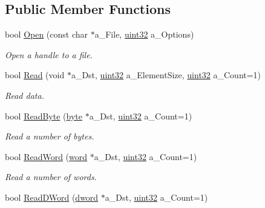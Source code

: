 \subsection*{Public Member Functions}
\begin{DoxyCompactItemize}
\item 
bool \hyperlink{classtil_1_1_file_stream_std_ab58f46883a8ccf5e3884fef0b6cb42d3}{Open} (const char $\ast$a\_\-File, \hyperlink{namespacetil_a20db61688ed403d11f057a508d87e54c}{uint32} a\_\-Options)
\begin{DoxyCompactList}\small\item\em Open a handle to a file. \item\end{DoxyCompactList}\item 
bool \hyperlink{classtil_1_1_file_stream_std_a5a4b5bb51ab27c50f2276c7c904e31b4}{Read} (void $\ast$a\_\-Dst, \hyperlink{namespacetil_a20db61688ed403d11f057a508d87e54c}{uint32} a\_\-ElementSize, \hyperlink{namespacetil_a20db61688ed403d11f057a508d87e54c}{uint32} a\_\-Count=1)
\begin{DoxyCompactList}\small\item\em Read data. \item\end{DoxyCompactList}\item 
bool \hyperlink{classtil_1_1_file_stream_std_a1eea3ea2ef520676df5f5b0c51c2659f}{ReadByte} (\hyperlink{namespacetil_a5f3ec10aca1a788b495a0bd3787bc2dc}{byte} $\ast$a\_\-Dst, \hyperlink{namespacetil_a20db61688ed403d11f057a508d87e54c}{uint32} a\_\-Count=1)
\begin{DoxyCompactList}\small\item\em Read a number of bytes. \item\end{DoxyCompactList}\item 
bool \hyperlink{classtil_1_1_file_stream_std_aadd59b38678d22428f311aa417aeca40}{ReadWord} (\hyperlink{namespacetil_a7903a6761ac6f7472530b2863401909e}{word} $\ast$a\_\-Dst, \hyperlink{namespacetil_a20db61688ed403d11f057a508d87e54c}{uint32} a\_\-Count=1)
\begin{DoxyCompactList}\small\item\em Read a number of words. \item\end{DoxyCompactList}\item 
bool \hyperlink{classtil_1_1_file_stream_std_a638af52afa0f132221dea6cb5b79faa6}{ReadDWord} (\hyperlink{namespacetil_a9babb870ec6cf9716ed0c90ea12811af}{dword} $\ast$a\_\-Dst, \hyperlink{namespacetil_a20db61688ed403d11f057a508d87e54c}{uint32} a\_\-Count=1)

\end{DoxyCompactItemize}
